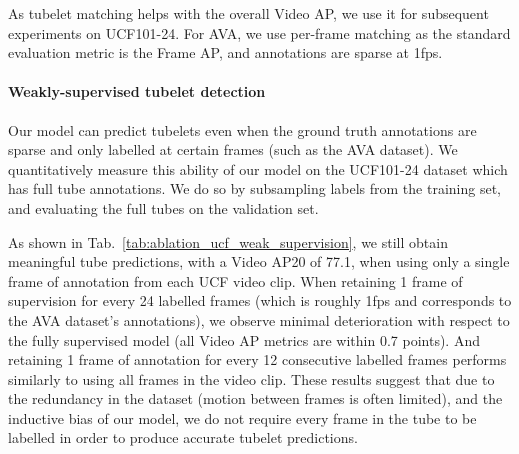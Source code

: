 \documentclass[10pt,twocolumn,letterpaper]{article}
\def \paravspace {-0.7\baselineskip}
\begin{document}
As tubelet matching helps with the overall Video AP, we use it for subsequent experiments on UCF101-24.
For AVA, we use per-frame matching as the standard evaluation metric is the Frame AP, and annotations are sparse at 1fps.

\vspace{\paravspace}
\paragraph{Weakly-supervised tubelet detection}
\begin{table}[t]
\caption{
Our model can predict tubelets even when the ground truth annotations are sparse.
We show this by subsampling training annotations from the UCF101-24 dataset.
Our model sees minimal performance deterioration even when using only $1 / 24$ or 4\% of the annotated frames.
}

\label{tab:ablation_ucf_weak_supervision}
\vspace{-0.5\baselineskip}
\end{table} 
Our model can predict tubelets even when the ground truth annotations are sparse and only labelled at certain frames (such as the AVA dataset).
We quantitatively measure this ability of our model on the UCF101-24 dataset which has full tube annotations.
We do so by subsampling labels from the training set, and evaluating the full tubes on the validation set.

As shown in Tab.~\ref{tab:ablation_ucf_weak_supervision}, we still obtain meaningful tube predictions, with a Video AP20 of 77.1, when using only a single frame of annotation from each UCF video clip.
When retaining 1 frame of supervision for every 24 labelled frames (which is roughly 1fps and corresponds to the AVA dataset's annotations), we observe minimal deterioration with respect to the fully supervised model (all Video AP metrics are within 0.7 points).
And retaining 1 frame of annotation for every 12 consecutive labelled frames performs similarly to using all frames in the video clip.
These results suggest that due to the redundancy in the dataset (motion between frames is often limited), and the inductive bias of our model, we do not require every frame in the tube to be labelled in order to produce accurate tubelet predictions.
\end{document}
